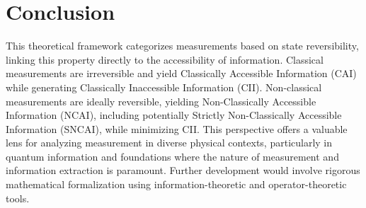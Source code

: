 	
	\section{Conclusion}
	
	This theoretical framework categorizes measurements based on state reversibility, linking this property directly to the accessibility of information. Classical measurements are irreversible and yield Classically Accessible Information (CAI) while generating Classically Inaccessible Information (CII). Non-classical measurements are ideally reversible, yielding Non-Classically Accessible Information (NCAI), including potentially Strictly Non-Classically Accessible Information (SNCAI), while minimizing CII. This perspective offers a valuable lens for analyzing measurement in diverse physical contexts, particularly in quantum information and foundations where the nature of measurement and information extraction is paramount. Further development would involve rigorous mathematical formalization using information-theoretic and operator-theoretic tools.
	
	
	
